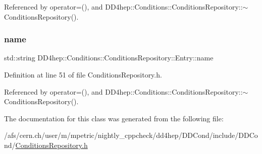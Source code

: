 Referenced by operator=(), and D\+D4hep\+::\+Conditions\+::\+Conditions\+Repository\+::$\sim$\+Conditions\+Repository().

\hypertarget{class_d_d4hep_1_1_conditions_1_1_conditions_repository_1_1_entry_a72388605da0e0b2ec2bafa344776f967}{}\label{class_d_d4hep_1_1_conditions_1_1_conditions_repository_1_1_entry_a72388605da0e0b2ec2bafa344776f967} 
\subsubsection{\texorpdfstring{name}{name}}
{\footnotesize\ttfamily std\+::string D\+D4hep\+::\+Conditions\+::\+Conditions\+Repository\+::\+Entry\+::name}



Definition at line 51 of file Conditions\+Repository.\+h.



Referenced by operator=(), and D\+D4hep\+::\+Conditions\+::\+Conditions\+Repository\+::$\sim$\+Conditions\+Repository().



The documentation for this class was generated from the following file\+:\begin{DoxyCompactItemize}
\item 
/afs/cern.\+ch/user/m/mpetric/nightly\+\_\+cppcheck/dd4hep/\+D\+D\+Cond/include/\+D\+D\+Cond/\hyperlink{_conditions_repository_8h}{Conditions\+Repository.\+h}\end{DoxyCompactItemize}
